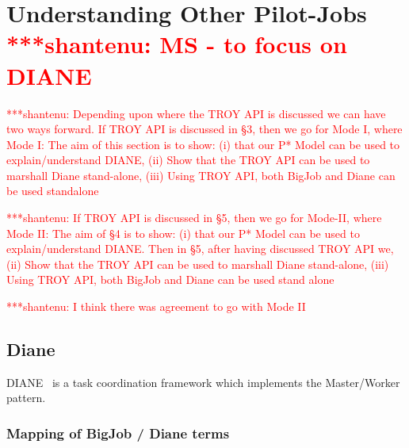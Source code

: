 \documentclass[conference,final]{IEEEtran}
\newcommand{\jhanote}[1]{ {\textcolor{red} { ***shantenu: #1 }}}
\newcommand{\jhanote}[1]{}
\begin{document}

\section{Understanding Other Pilot-Jobs \jhanote{MS - to focus on
    DIANE}}


\jhanote{Depending upon where the TROY API is discussed we can have
  two ways forward. If TROY API is discussed in \S 3, then we go for
  Mode I, where Mode I: The aim of this section is to show: (i) that
  our P* Model can be used to explain/understand DIANE, (ii) Show that
  the TROY API can be used to marshall Diane stand-alone, (iii) Using
  TROY API, both BigJob and Diane can be used standalone}

\jhanote{If TROY API is discussed in \S 5, then we go for Mode-II,
  where Mode II: The aim of \S 4 is to show: (i) that our P* Model can
  be used to explain/understand DIANE.  Then in \S 5, after having
  discussed TROY API we, (ii) Show that the TROY API can be used to
  marshall Diane stand-alone, (iii) Using TROY API, both BigJob and
  Diane can be used stand alone}

\jhanote{I think there was agreement to go with Mode II}

\subsection{Diane}

DIANE~\cite{Moscicki:908910} is a task coordination framework which
implements the Master/Worker pattern.

\subsubsection{Mapping of BigJob / Diane terms}
\end{document}

